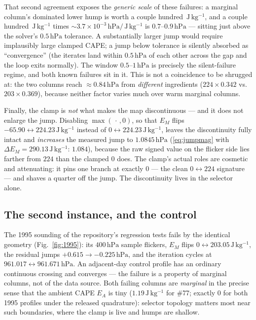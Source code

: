 \documentclass[11pt,a4paper]{article}
\theoremstyle{definition}
\newcommand{\hPa}{\,\mathrm{hPa}}
\newcommand{\Jkg}{\,\mathrm{J\,kg^{-1}}}
\begin{document}
That second agreement exposes the \emph{generic scale} of these failures:
a marginal column's dominated lower hump is worth a couple hundred
$\Jkg$, and a couple hundred $\Jkg$ times
$\sim3.7\times10^{-3}\hPa/\Jkg$ is $0.7$--$0.9\hPa$ --- sitting just above
the solver's $0.5\hPa$ tolerance.  A substantially larger jump would
require implausibly large clamped CAPE; a jump below tolerance is silently
absorbed as ``convergence'' (the iterates land within $0.5\hPa$ of each
other across the gap and the loop exits normally).  The window
$0.5$--$1\hPa$ is precisely the silent-failure regime, and both known
failures sit in it.  This is not a coincidence to be shrugged at: the two
columns reach $\approx0.84\hPa$ from \emph{different} ingredients
($224\times0.342$ vs.\ $203\times0.369$), because neither factor varies
much over warm marginal columns.

Finally, the clamp is \emph{not} what makes the map discontinuous --- and
it does not enlarge the jump.  Disabling $\max(\,\cdot\,,0)$, so that $E_M$
flips $-65.90\leftrightarrow224.23\Jkg$ instead of
$0\leftrightarrow224.23\Jkg$, leaves the discontinuity fully intact and
\emph{increases} the measured jump to $1.0845\hPa$
(\eqref{eq:jumpmag} with $\Delta E_M=290.13\Jkg$: $1.084$), because the raw
signed value on the flicker side lies farther from $224$ than the clamped
$0$ does.  The clamp's actual roles are cosmetic and attenuating: it pins
one branch at exactly $0$ --- the clean $0\leftrightarrow224$ signature ---
and shaves a quarter off the jump.  The discontinuity lives in the selector
alone.

\subsection{The second instance, and the control}

The 1995 sounding of the repository's regression tests fails by the
identical geometry (Fig.~\ref{fig:1995}): its $400\hPa$ sample flickers,
$E_M$ flips $0\leftrightarrow203.05\Jkg$, the residual jumps
$+0.615\to-0.225\hPa$, and the iteration cycles at
$961.017\leftrightarrow961.671\hPa$.  An adjacent-day
control profile has an ordinary continuous crossing and converges --- the
failure is a property of marginal columns, not of the data source.  Both
failing columns are \emph{marginal} in the precise sense that the ambient
CAPE $E_A$ is tiny ($1.19\Jkg$ for \#77; exactly $0$ for both 1995 profiles
under the released quadrature): selector topology matters most near such
boundaries, where the clamp is live and humps are shallow.
\end{document}
